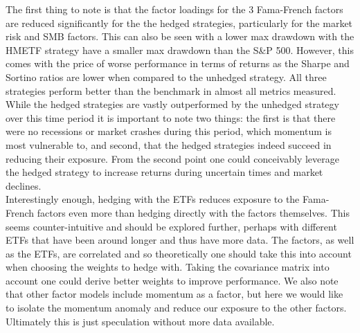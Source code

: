 \documentclass[10pt, letterpaper]{article}
\begin{document}
The first thing to note is that the factor loadings for the 3 Fama-French factors are reduced significantly for the the hedged strategies, particularly for the market risk and SMB factors.  This can also be seen with a lower max drawdown with the HMETF strategy have a smaller max drawdown than the S\&P 500.  However, this comes with the price of worse performance in terms of returns as the Sharpe and Sortino ratios are lower when compared to the unhedged strategy.  All three strategies perform better than the benchmark in almost all metrics measured.  While the hedged strategies are vastly outperformed by the unhedged strategy over this time period it is important to note two things: the first is that there were no recessions or market crashes during this period, which momentum is most vulnerable to, and second, that the hedged strategies indeed succeed in reducing their exposure.  From the second point one could conceivably leverage the hedged strategy to increase returns during uncertain times and market declines. \\

Interestingly enough, hedging with the ETFs reduces exposure to the Fama-French factors even more than hedging directly with the factors themselves.  This seems counter-intuitive and should be explored further, perhaps with different ETFs that have been around longer and thus have more data.  The factors, as well as the ETFs, are correlated and so theoretically one should take this into account when choosing the weights to hedge with.  Taking the covariance matrix into account one could derive better weights to improve performance.  We also note that other factor models include momentum as a factor, but here we would like to isolate the momentum anomaly and reduce our exposure to the other factors.  Ultimately this is just speculation without more data available.
\end{document}
